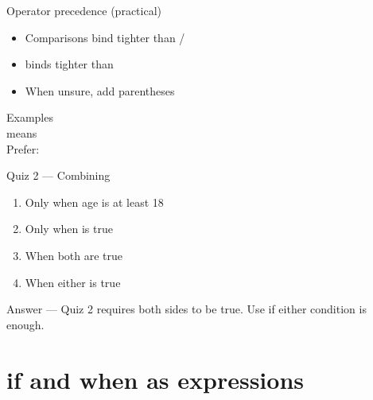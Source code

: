 \documentclass[aspectratio=169,11pt]{beamer}
\begin{document}
    \begin{frame}{Operator precedence (practical)}
        \begin{itemize}
            \item Comparisons bind tighter than \kotlincode{\&\&} / \kotlincode{||}
            \item \kotlincode{\&\&} binds tighter than \kotlincode{||}
            \item When unsure, add parentheses
        \end{itemize}
        \vspace{0.5em}
        \begin{block}{Examples}
            \\
            means \\[0.4em]
            Prefer: 
        \end{block}
    \end{frame}

    \begin{frame}{Quiz 2 --- Combining}
        \begin{enumerate}
            \item Only when age is at least 18
            \item Only when  is true
            \item When both are true
            \item When either is true
        \end{enumerate}
        \quizpause
    \end{frame}

    \begin{frame}{Answer --- Quiz 2}
        \vspace{0.4em}
        \kotlincode{\&\&} requires both sides to be true.
        Use \kotlincode{||} if either condition is enough.
    \end{frame}

    \section{if and when as expressions}
\end{document}
